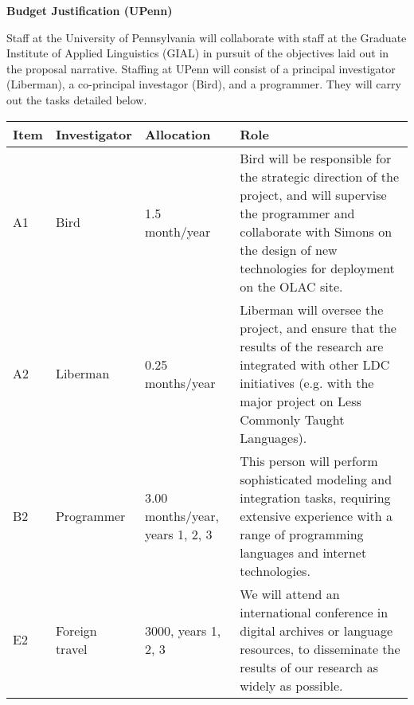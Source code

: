 \documentclass[11pt]{nsf}
\begin{document}
\begin{center}\textbf{\Large
Budget Justification (UPenn)
}\end{center}

Staff at the University of Pennsylvania will collaborate with staff at
the Graduate Institute of Applied Linguistics (GIAL) in pursuit of
the objectives laid out in the proposal narrative.
Staffing at UPenn will consist of a principal investigator (Liberman),
a co-principal investagor (Bird), and a programmer.  They will carry
out the tasks detailed below.

\vspace{1ex}

{\small\noindent
\begin{tabular}{lllp{3in}}
\textbf{Item} &
\textbf{Investigator} & \textbf{Allocation} & \textbf{Role} \\ \hline

A1 & Bird & 1.5 month/year &
Bird will be responsible for the strategic direction of the project,
and will supervise the programmer and collaborate with Simons on the
design of new technologies for deployment on the OLAC site.\\

A2 & Liberman & 0.25 months/year &
Liberman will oversee the project, and ensure that the results of the
research are integrated with other LDC initiatives (e.g. with the
major project on Less Commonly Taught Languages).\\

B2 & Programmer & 3.00 months/year, years 1, 2, 3 &
This person will perform sophisticated modeling and integration tasks,
requiring extensive experience with a range of programming languages
and internet technologies. \\

E2 & Foreign travel & 3000, years 1, 2, 3 &
We will attend an international conference in digital archives or
language resources, to disseminate the results of our research as
widely as possible. \\

\end{tabular}}
\end{document}

